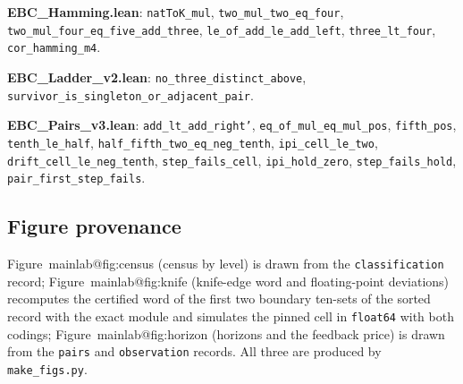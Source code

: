 \documentclass[11pt,a4paper]{article}
\makeatletter
\theoremstyle{plain}
\theoremstyle{definition}
\theoremstyle{remark}
\newcommand{\mref}[1]{\csname mainlab@#1\endcsname}
\makeatother
\begin{document}
\textbf{EBC\_Hamming.lean}: \texttt{natToK\_\allowbreak{}mul}, \texttt{two\_\allowbreak{}mul\_\allowbreak{}two\_\allowbreak{}eq\_\allowbreak{}four}, \texttt{two\_\allowbreak{}mul\_\allowbreak{}four\_\allowbreak{}eq\_\allowbreak{}five\_\allowbreak{}add\_\allowbreak{}three}, \texttt{le\_\allowbreak{}of\_\allowbreak{}add\_\allowbreak{}le\_\allowbreak{}add\_\allowbreak{}left}, \texttt{three\_\allowbreak{}lt\_\allowbreak{}four}, \texttt{cor\_\allowbreak{}hamming\_\allowbreak{}m4}.

\textbf{EBC\_Ladder\_v2.lean}: \texttt{no\_\allowbreak{}three\_\allowbreak{}distinct\_\allowbreak{}above}, \texttt{survivor\_\allowbreak{}is\_\allowbreak{}singleton\_\allowbreak{}or\_\allowbreak{}adjacent\_\allowbreak{}pair}.

\textbf{EBC\_Pairs\_v3.lean}: \texttt{add\_\allowbreak{}lt\_\allowbreak{}add\_\allowbreak{}right'}, \texttt{eq\_\allowbreak{}of\_\allowbreak{}mul\_\allowbreak{}eq\_\allowbreak{}mul\_\allowbreak{}pos}, \texttt{fifth\_\allowbreak{}pos}, \texttt{tenth\_\allowbreak{}le\_\allowbreak{}half}, \texttt{half\_\allowbreak{}fifth\_\allowbreak{}two\_\allowbreak{}eq\_\allowbreak{}neg\_\allowbreak{}tenth}, \texttt{ipi\_\allowbreak{}cell\_\allowbreak{}le\_\allowbreak{}two}, \texttt{drift\_\allowbreak{}cell\_\allowbreak{}le\_\allowbreak{}neg\_\allowbreak{}tenth}, \texttt{step\_\allowbreak{}fails\_\allowbreak{}cell}, \texttt{ipi\_\allowbreak{}hold\_\allowbreak{}zero}, \texttt{step\_\allowbreak{}fails\_\allowbreak{}hold}, \texttt{pair\_\allowbreak{}first\_\allowbreak{}step\_\allowbreak{}fails}.

\subsection{Figure provenance}
Figure~\mref{fig:census} (census by level) is drawn from the \texttt{classification} record; Figure~\mref{fig:knife} (knife-edge word and floating-point deviations) recomputes the certified word of the first two boundary ten-sets of the sorted record with the exact module and simulates the pinned cell in \texttt{float64} with both codings; Figure~\mref{fig:horizon} (horizons and the feedback price) is drawn from the \texttt{pairs} and \texttt{observation} records. All three are produced by \texttt{make\_figs.py}.
\end{document}
